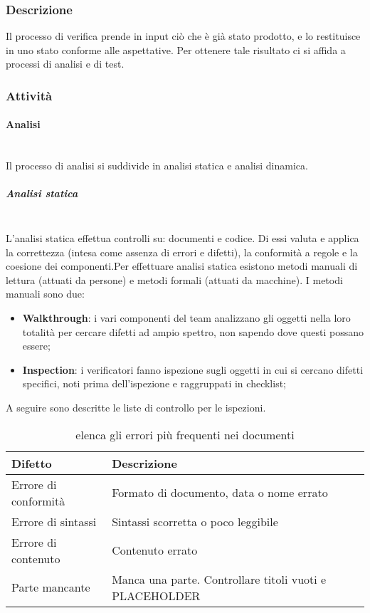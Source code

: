 		\subsubsection{Descrizione}
		Il processo di verifica prende in input ciò che è già stato prodotto, e lo restituisce in uno stato conforme alle aspettative. Per ottenere tale risultato ci si affida a processi di analisi e di test.
		\subsubsection{Attività}
			\paragraph{Analisi} \mbox{}\\
			Il processo di analisi si suddivide in analisi statica e analisi dinamica.
				\subparagraph{Analisi statica} \mbox{}\\
				L'analisi statica effettua controlli su: documenti e codice. Di essi valuta e applica la correttezza (intesa come assenza di errori e difetti), la conformità a regole e la coesione dei componenti.\newline Per effettuare analisi statica esistono metodi manuali di lettura (attuati da persone) e metodi formali (attuati da macchine). I metodi manuali sono due:
				\begin{itemize}
					\item \textbf{Walkthrough}: i vari componenti del team analizzano gli oggetti nella loro totalità per cercare difetti ad ampio spettro, non sapendo dove questi possano essere;
					\item \textbf{Inspection}: i verificatori fanno ispezione sugli oggetti in cui si cercano difetti specifici, noti prima dell'ispezione e raggruppati in checklist;
				\end{itemize}
				A seguire sono descritte le liste di controllo per le ispezioni.
				
				\begin{table}[!h]
					\centering
					\begin{tabular}{|l|l|}
						\hline
					\textbf{Difetto} & \textbf{Descrizione}\\
					\hline
					Errore di conformità & Formato di documento, data o nome errato\\
					\hline
					Errore di sintassi & Sintassi scorretta o poco leggibile\\
					\hline
					Errore di contenuto & Contenuto errato\\
					\hline
					Parte mancante & Manca una parte. Controllare titoli vuoti e PLACEHOLDER\\
					\hline			
					\end{tabular}
					\caption{elenca gli errori più frequenti nei documenti}
					\label{Tabella 1:}
				\end{table}
				
